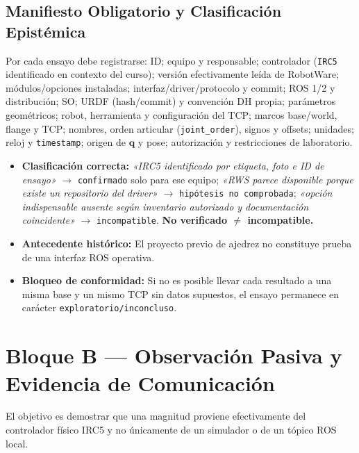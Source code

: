 \documentclass[10pt, a4paper]{article}
\begin{document}
\subsection{Manifiesto Obligatorio y Clasificación Epistémica}
Por cada ensayo debe registrarse: ID; equipo y responsable; controlador (\texttt{IRC5} identificado en contexto del curso); versión efectivamente leída de RobotWare; módulos/opciones instaladas; interfaz/driver/protocolo y commit; ROS 1/2 y distribución; SO; URDF (hash/commit) y convención DH propia; parámetros geométricos; robot, herramienta y configuración del TCP; marcos base/world, flange y TCP; nombres, orden articular (\texttt{joint\_order}), signos y offsets; unidades; reloj y \texttt{timestamp}; origen de $\mathbf{q}$ y pose; autorización y restricciones de laboratorio.

\begin{itemize}[leftmargin=*, itemsep=2pt]
    \item \textbf{Clasificación correcta:} \textit{«IRC5 identificado por etiqueta, foto e ID de ensayo»} $\to$ \texttt{confirmado} solo para ese equipo; \textit{«RWS parece disponible porque existe un repositorio del driver»} $\to$ \texttt{hipótesis no comprobada}; \textit{«opción indispensable ausente según inventario autorizado y documentación coincidente»} $\to$ \texttt{incompatible}. \textbf{No verificado $\neq$ incompatible.}
    \item \textbf{Antecedente histórico:} El proyecto previo de ajedrez no constituye prueba de una interfaz ROS operativa.
    \item \textbf{Bloqueo de conformidad:} Si no es posible llevar cada resultado a una misma base y un mismo TCP sin datos supuestos, el ensayo permanece en carácter \texttt{exploratorio/inconcluso}.
\end{itemize}

\section{Bloque B — Observación Pasiva y Evidencia de Comunicación}

El objetivo es demostrar que una magnitud proviene efectivamente del controlador físico IRC5 y no únicamente de un simulador o de un tópico ROS local.
\end{document}
